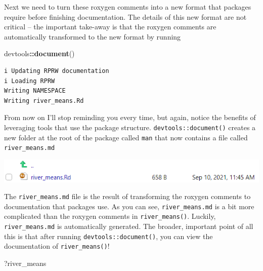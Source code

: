 \documentclass[
]{book}
\newenvironment{Shaded}{\begin{snugshade}}{\end{snugshade}}
\newcommand{\KeywordTok}[1]{\textcolor[rgb]{0.13,0.29,0.53}{\textbf{#1}}}
\newcommand{\NormalTok}[1]{#1}
\newcommand{\OperatorTok}[1]{\textcolor[rgb]{0.81,0.36,0.00}{\textbf{#1}}}
\begin{document}
Next we need to turn these roxygen comments into a new format that packages require before finishing documentation. The details of this new format are not critical -- the important take-away is that the roxygen comments are automatically transformed to the new format by running

\begin{Shaded}
\begin{Highlighting}[]
\NormalTok{devtools}\OperatorTok{::}\KeywordTok{document}\NormalTok{()}
\end{Highlighting}
\end{Shaded}

\begin{verbatim}
i Updating RPRW documentation
i Loading RPRW
Writing NAMESPACE
Writing river_means.Rd
\end{verbatim}

From now on I'll stop reminding you every time, but again, notice the benefits of leveraging tools that use the package structure. \texttt{devtools::document()} creates a new folder at the root of the package called \texttt{man} that now contains a file called \texttt{river\_means.md}

\includegraphics[width=1\linewidth]{images/newrpack_files2}

The \texttt{river\_means.md} file is the result of transforming the roxygen comments to documentation that packages use. As you can see, \texttt{river\_means.md} is a bit more complicated than the roxygen comments in \texttt{river\_means()}. Luckily, \texttt{river\_means.md} is automatically generated. The broader, important point of all this is that after running \texttt{devtools::document()}, you can view the documentation of \texttt{river\_means()}!

\begin{Shaded}
\begin{Highlighting}[]
\NormalTok{?river_means}
\end{Highlighting}
\end{Shaded}
\end{document}
